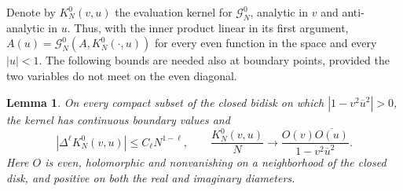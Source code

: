 \documentclass[11pt]{article}
\numberwithin{equation}{section}
\newtheorem{lemma}[theorem]{Lemma}
\theoremstyle{definition}\newtheorem{definition}[theorem]{Definition}
\theoremstyle{remark}\newtheorem{remark}[theorem]{Remark}
\begin{document}
Denote by $K_N^0(v,u)$ the evaluation kernel for
$\mathcal G_N^0$, analytic in $v$ and anti-analytic in $u$.
Thus, with the inner product linear in its first argument,
$A(u)=\mathcal G_N^0(A,K_N^0(\cdot,u))$ for every even function in the
space and every $|u|<1$. The following bounds are needed also at boundary
points, provided the two variables do not meet on the even diagonal.

\begin{lemma}\label{c:model-kernel}
On every compact subset of the closed bidisk on which
$|1-v^2\overline u^2|>0$, the kernel has continuous boundary values and
\[
 |\Delta^\ell K_N^0(v,u)|\le C_\ell N^{1-\ell},\qquad
 \frac{K_N^0(v,u)}N\longrightarrow
 \frac{O(v)\overline{O(u)}}{1-v^2\overline u^2}.
\]
Here $O$ is even, holomorphic and nonvanishing on a neighborhood of the
closed disk, and positive on both the real and imaginary diameters.
\end{lemma}
\end{document}
